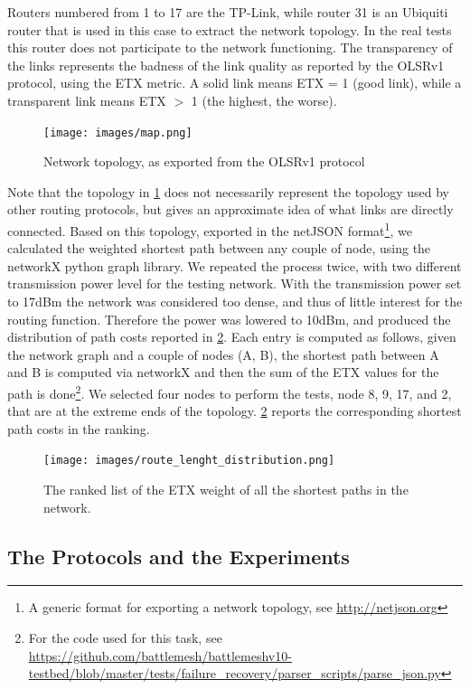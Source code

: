 \documentclass[10pt,onecolumn]{paper}
\begin{document}
Routers numbered from 1 to 17 are the TP-Link, while router 31 is an Ubiquiti
router that is used in this case to extract the network topology. In the real
tests this router does not participate to the network functioning. The
transparency of the links represents the badness of the link quality as reported
by the OLSRv1 protocol, using the ETX metric. A solid link means ETX =
1 (good link), while a transparent link means ETX $>$ 1 (the highest, the worse).


\begin{figure}[!htb]
  \centering
  \texttt{[image: images/map.png]}
  \caption{Network topology, as exported from the OLSRv1 protocol} 
  \label{fig:topo}
\end{figure}%

Note that the topology in \cref{fig:topo} does not necessarily represent the
topology used by other routing protocols, but gives an approximate idea of what
links are directly connected. Based on this topology, exported in the netJSON
format\footnote{A generic format for exporting a network topology, see
\url{http://netjson.org}}, we calculated the weighted shortest path between any couple of node,
using the networkX python graph
library. We repeated the process twice, with two different transmission power
level for the testing network. With the transmission power set to 17dBm the
network was considered too dense, and thus of little interest for the routing
function. Therefore the power was lowered to 10dBm, and produced the
distribution of path costs reported in \cref{fig:ETXrank}. Each entry is computed
as follows, given the network graph and a couple of nodes (A, B), the shortest
path between A and B is computed via networkX and then the sum of the ETX values
for the path is done\footnote{For the code used for this task, see
\url{https://github.com/battlemesh/battlemeshv10-testbed/blob/master/tests/failure_recovery/parser_scripts/parse_json.py}}. We selected four nodes
to perform the tests, node 8, 9, 17, and 2, that are at the extreme ends of the
topology. \cref{fig:ETXrank} reports the corresponding shortest path costs in
the ranking.

\begin{figure}[!htb]
  \centering
  \texttt{[image: images/route\_lenght\_distribution.png]}
  \caption{The ranked list of the ETX weight of all the shortest paths in the
    network.} 
  \label{fig:ETXrank}
\end{figure}

\subsection{The Protocols and the Experiments}
\end{document}
